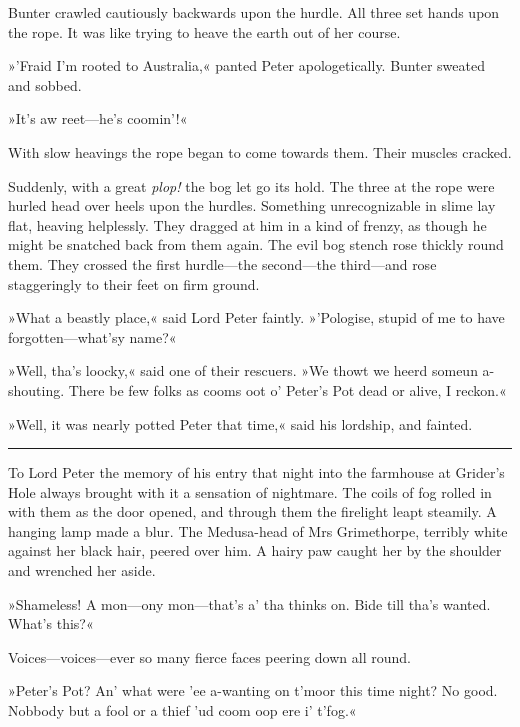 Bunter crawled cautiously backwards upon the hurdle. All three set hands upon the rope. It was like trying to heave the earth out of her course.

»'Fraid I'm rooted to Australia,« panted Peter apologetically. Bunter sweated and sobbed.

»It's aw reet\allowbreak---\allowbreak he's coomin'!«

With slow heavings the rope began to come towards them. Their muscles cracked.

Suddenly, with a great \textit{plop!} the bog let go its hold. The three at the rope were hurled head over heels upon the hurdles. Something unrecognizable in slime lay flat, heaving helplessly. They dragged at him in a kind of frenzy, as though he might be snatched back from them again. The evil bog stench rose thickly round them. They crossed the first hurdle\allowbreak---\allowbreak the second\allowbreak---\allowbreak the third\allowbreak---\allowbreak and rose staggeringly to their feet on firm ground.

»What a beastly place,« said Lord Peter faintly. »'Pologise, stupid of me to have forgotten\allowbreak---\allowbreak what'sy name?«

»Well, tha's loocky,« said one of their rescuers. »We thowt we heerd someun a-shouting. There be few folks as cooms oot o' Peter's Pot dead or alive, I reckon.«

»Well, it was nearly potted Peter that time,« said his lordship, and fainted. 

\noindent\hfil\rule{0.5\textwidth}{.4pt}\hfil 

To Lord Peter the memory of his entry that night into the farmhouse at Grider's Hole always brought with it a sensation of nightmare.  The coils of fog rolled in with them as the door opened, and through them the firelight leapt steamily. A hanging lamp made a blur. The Medusa-head of Mrs Grimethorpe, terribly white against her black hair, peered over him. A hairy paw caught her by the shoulder and wrenched her aside.

»Shameless! A mon\allowbreak---\allowbreak ony mon\allowbreak---\allowbreak that's a' tha thinks on. Bide till tha's wanted. What's this?«

Voices\allowbreak---\allowbreak voices---ever so many fierce faces peering down all round.

»Peter's Pot? An' what were 'ee a-wanting on t'moor this time night? No good. Nobbody but a fool or a thief 'ud coom oop ere i' t'fog.«

